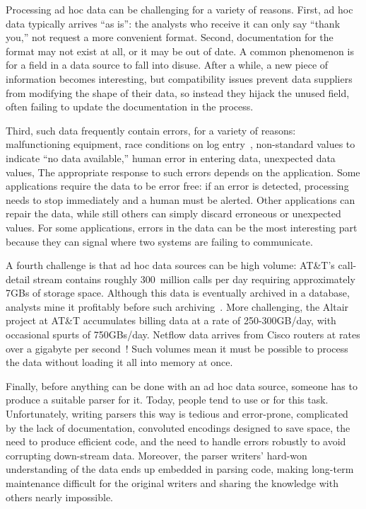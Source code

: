 \documentclass{sig-alternate}
\newcommand{\ningaui}{Altair}
\begin{document}
Processing ad hoc data can be challenging for a variety of
reasons. First, ad hoc data typically arrives ``as is'': the analysts
who receive it can only say ``thank you,'' not request a more convenient format. 
Second, documentation for the format may not exist at all, or it may be
out of date.  A common phenomenon is for a field in a
data source to fall into disuse.  After a while, a new piece of
information becomes interesting, but compatibility issues prevent 
data suppliers from modifying the
shape of their data, so instead they hijack the unused field, often
failing to update the documentation in the process.

Third, such data frequently contain errors, for a variety of
reasons: malfunctioning equipment, race conditions on log
entry~\cite{wpp}, non-standard values to indicate ``no data
available,'' human error in entering data, unexpected data
values, \etc{} The appropriate response to such errors depends on the application. Some applications require the data to be error free: 
if an error is detected, processing needs to stop immediately and a human
must be alerted.  Other applications can repair the data, while still
others can simply discard erroneous or unexpected values.  
For some applications,
errors in the data can be the most interesting part  because
they can signal where two systems are failing to communicate.

A fourth challenge is that ad hoc data sources can be high volume:
AT\&T's call-detail stream contains roughly 300~million calls per day
requiring approximately 7GBs of storage space. Although this data is
eventually archived in a database, analysts mine it profitably before
such archiving~\cite{kdd98,kdd99}. More challenging, the \ningaui{} project at AT\&T
accumulates billing data at a rate
of 250-300GB/day, with occasional spurts of 750GBs/day. Netflow data
arrives from Cisco routers at rates over a gigabyte per
second~\cite{gigascope}! Such volumes mean it must be possible to
process the data without loading it all into memory at once.

Finally, before anything can be done with an ad hoc data source,
someone has to produce a suitable parser for it.
Today, people tend to use \C{} or \perl{} for this task.
Unfortunately, writing
parsers this way is tedious and error-prone, complicated by the lack
of documentation, convoluted encodings designed to save space, 
the need to produce efficient code,
and the need to handle errors robustly to avoid corrupting down-stream data.
Moreover, the parser writers' hard-won understanding of the data
ends up embedded in parsing code, making long-term maintenance
difficult for the original writers and sharing the knowledge with
others nearly impossible.
\end{document}
